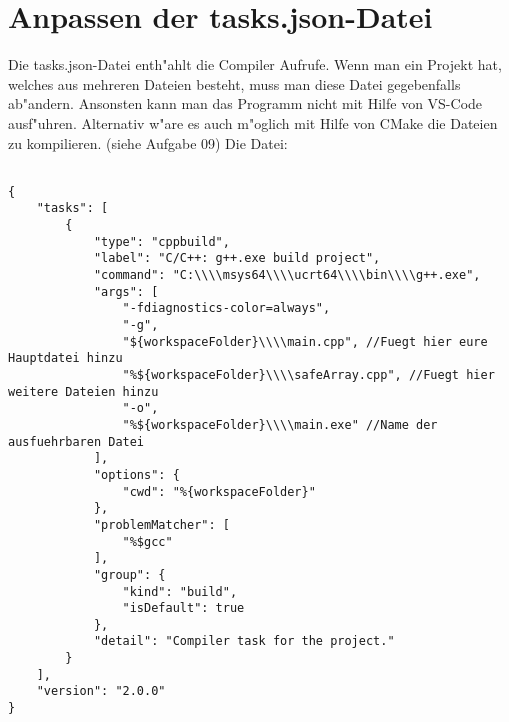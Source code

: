 \documentclass[a4paper,11pt,titlepage]{article}
\begin{document}
\section{Anpassen der tasks.json-Datei}
Die tasks.json-Datei enth"ahlt die Compiler Aufrufe. Wenn man ein Projekt hat, welches aus mehreren Dateien besteht, muss man diese Datei gegebenfalls ab"andern. Ansonsten kann man das Programm nicht mit Hilfe von VS-Code ausf"uhren. Alternativ w"are es auch m"oglich mit Hilfe von CMake die Dateien zu kompilieren. (siehe Aufgabe 09)\newpage
Die Datei:\\
\begin{lstlisting}[style = c++] %Ist eigentlich nicht c++!!

{
    "tasks": [
        {
            "type": "cppbuild",
            "label": "C/C++: g++.exe build project",
            "command": "C:\\\\msys64\\\\ucrt64\\\\bin\\\\g++.exe",
            "args": [
                "-fdiagnostics-color=always",
                "-g",
                "${workspaceFolder}\\\\main.cpp", //Fuegt hier eure Hauptdatei hinzu
                "%${workspaceFolder}\\\\safeArray.cpp", //Fuegt hier weitere Dateien hinzu
                "-o",
                "%${workspaceFolder}\\\\main.exe" //Name der ausfuehrbaren Datei
            ],
            "options": {
                "cwd": "%{workspaceFolder}"
            },
            "problemMatcher": [
                "%$gcc"
            ],
            "group": {
                "kind": "build",
                "isDefault": true
            },
            "detail": "Compiler task for the project."
        }
    ],
    "version": "2.0.0"
}
\end{lstlisting}
\end{document}
